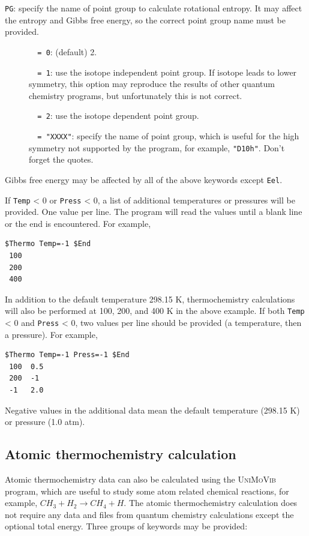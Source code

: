 \documentclass[12pt,english]{extarticle}
\begin{document}
\bigskip{}
\verb|PG|: specify the name of point group to calculate rotational
entropy. It may affect the entropy and Gibbs free energy, so the correct point group
name must be provided.
\begin{description}
\item[ ]\verb|  = 0|: (default) 2.
\item[ ]\verb|  = 1|: use the isotope independent point group. If isotope leads to lower symmetry, this option may
reproduce the results of other quantum chemistry programs, but unfortunately this is
not correct.
\item[ ]\verb|  = 2|: use the isotope dependent point group.
\item[ ]\verb|  = "XXXX"|: specify the name of point group, which is useful for the high symmetry not supported by the program, for example, \verb|"D10h"|. Don't forget the quotes.
\end{description}

Gibbs free energy may be affected by all of the above keywords except \verb|Eel|.

If \verb|Temp| < 0 or \verb|Press| < 0, a list of additional temperatures or pressures will be provided. One value per line. The program will
read the values until a blank line or the end is encountered.
For example,
\begin{Verbatim}[frame=single]
 $Thermo Temp=-1 $End
 100
 200
 400
\end{Verbatim}
In addition to the default temperature 298.15 K, thermochemistry calculations will also be performed at 100, 200, and 400 K in the above example. If both \verb|Temp| < 0 and \verb|Press| < 0, two values per line should be provided (a temperature, then a pressure). For example,
\begin{Verbatim}[frame=single]
 $Thermo Temp=-1 Press=-1 $End
 100  0.5
 200  -1
 -1   2.0
\end{Verbatim}
Negative values in the additional data mean the default temperature (298.15 K) or pressure (1.0 atm).

\subsection{Atomic thermochemistry calculation} \label{sec:inp-atom}

Atomic thermochemistry data can also be calculated using the \textsc{UniMoVib} program, which are useful to
study some atom related chemical reactions, for example, $CH_3 + H_2 \rightarrow CH_4 + H$. The atomic
thermochemistry calculation does not require any data and files from quantum chemistry calculations except the
optional total energy. Three groups of keywords may be provided:
\end{document}
